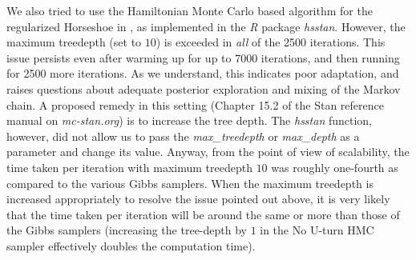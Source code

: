 \documentclass[noinfoline,11pt]{imsart}
\numberwithin{equation}{section}
\theoremstyle{plain}
\begin{document}
We also tried to use the Hamiltonian Monte Carlo based algorithm for the  
regularized Horseshoe in \cite{piironen2017}, as implemented in the {\it R} 
package {\it hsstan}. However, the maximum treedepth (set to $10$) is exceeded in 
{\it all} of the 2500 iterations. This issue persists even after warming up for up 
to 7000 iterations, and then running for 2500 more iterations. As we understand, this
indicates poor adaptation, and raises questions about adequate posterior exploration 
and  mixing of the Markov chain. A proposed remedy in this setting (Chapter 15.2 of 
the Stan reference manual on {\it mc-stan.org}) is to increase the tree depth. The 
{\it hsstan} function, however, did not allow us to pass the {\it max\_treedepth} or 
{\it max\_depth} as a parameter and change its value. Anyway, from the point of view 
of scalability, the time taken per iteration with maximum treedepth $10$ was roughly 
one-fourth as compared to the various Gibbs samplers. When the maximum treedepth is 
increased appropriately to resolve the issue pointed out above, it is very likely 
that the time taken per iteration will be around the same or more than those of the 
Gibbs samplers (increasing the tree-depth by $1$ in the No U-turn HMC sampler 
effectively doubles the computation time). 
\end{document}
